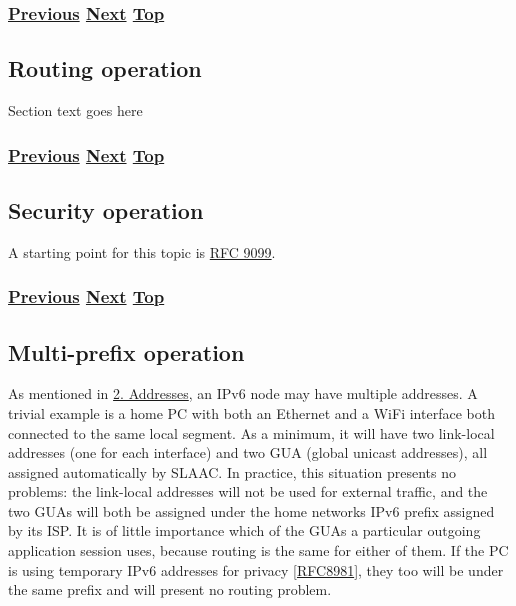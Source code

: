 \documentclass[
]{article}
\begin{document}
\subsubsection{\texorpdfstring{\hyperref[remote-configuration]{Previous}
\hyperref[routing-operation]{Next}
\hyperref[management-and-operations]{Top}}{Previous Next Top}}\label{previous-next-top-27}

\pagebreak

\subsection{Routing operation}\label{routing-operation}

Section text goes here

\subsubsection{\texorpdfstring{\hyperref[benchmarking-and-monitoring]{Previous}
\hyperref[security-operation]{Next}
\hyperref[management-and-operations]{Top}}{Previous Next Top}}\label{previous-next-top-28}

\pagebreak

\subsection{Security operation}\label{security-operation}

A starting point for this topic is
\href{https://www.rfc-editor.org/info/rfc9099}{RFC 9099}.

\subsubsection{\texorpdfstring{\hyperref[routing-operation]{Previous}
\hyperref[multi-prefix-operation]{Next}
\hyperref[management-and-operations]{Top}}{Previous Next Top}}\label{previous-next-top-29}

\pagebreak

\subsection{Multi-prefix operation}\label{multi-prefix-operation}

As mentioned in \hyperref[addresses]{2. Addresses}, an IPv6 node may
have multiple addresses. A trivial example is a home PC with both an
Ethernet and a WiFi interface both connected to the same local segment.
As a minimum, it will have two link-local addresses (one for each
interface) and two GUA (global unicast addresses), all assigned
automatically by SLAAC. In practice, this situation presents no
problems: the link-local addresses will not be used for external
traffic, and the two GUAs will both be assigned under the home
network\textquotesingle s IPv6 prefix assigned by its ISP. It is of
little importance which of the GUAs a particular outgoing application
session uses, because routing is the same for either of them. If the PC
is using temporary IPv6 addresses for privacy
{[}\href{https://www.rfc-editor.org/info/rfc8981}{RFC8981}{]}, they too
will be under the same prefix and will present no routing problem.
\end{document}
